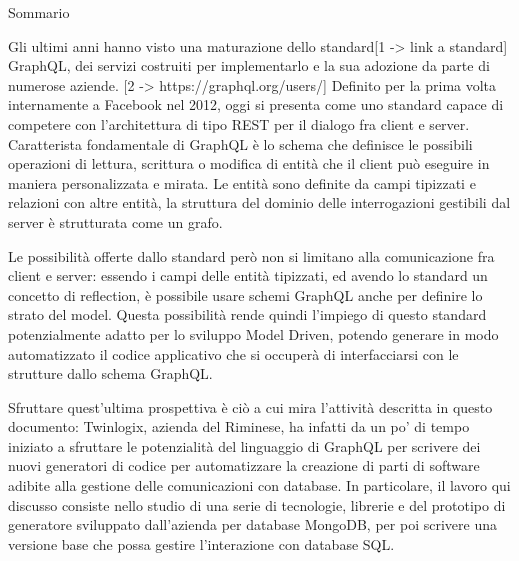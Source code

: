 Sommario



Gli ultimi anni hanno visto una maturazione dello standard[1 -> link a standard] GraphQL, dei servizi costruiti per implementarlo e la sua adozione da parte di numerose aziende. [2 -> https://graphql.org/users/]
Definito per la prima volta internamente a Facebook nel 2012, oggi si presenta come uno standard capace di competere con l'architettura di tipo REST per il dialogo fra client e server.
Caratterista fondamentale di GraphQL è lo schema che definisce le possibili operazioni di lettura, scrittura o modifica di entità che il client può eseguire in maniera personalizzata e mirata.
Le entità sono definite da campi tipizzati e relazioni con altre entità, la struttura del dominio delle interrogazioni gestibili dal server è strutturata come un grafo.

Le possibilità offerte dallo standard però non si limitano alla comunicazione fra client e server: essendo i campi delle entità tipizzati, ed avendo lo standard un concetto di reflection, è possibile usare 
schemi GraphQL anche per definire lo strato del model.
Questa possibilità rende quindi l'impiego di questo standard potenzialmente adatto per lo sviluppo Model Driven, potendo generare in modo automatizzato il codice applicativo che si occuperà di interfacciarsi con le strutture dallo schema GraphQL.

Sfruttare quest'ultima prospettiva è ciò a cui mira l'attività descritta in questo documento: Twinlogix, azienda del Riminese, ha infatti da un po' di tempo iniziato a sfruttare le potenzialità del linguaggio di GraphQL per scrivere dei nuovi generatori
di codice per automatizzare la creazione di parti di software adibite alla gestione delle comunicazioni con database.
In particolare, il lavoro qui discusso consiste nello studio di una serie di tecnologie, librerie e del prototipo di generatore sviluppato dall'azienda per database MongoDB, per poi scrivere una versione base che possa gestire l'interazione con database SQL.


